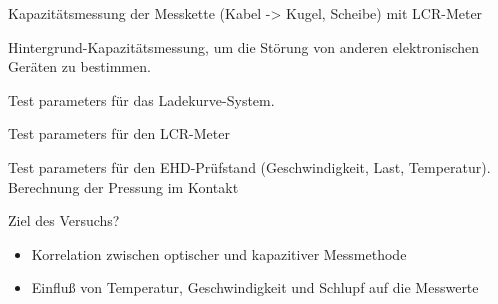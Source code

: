 Kapazitätsmessung der Messkette (Kabel -> Kugel, Scheibe) mit LCR-Meter

Hintergrund-Kapazitätsmessung, um die Störung von anderen elektronischen Geräten zu bestimmen.

Test parameters für das Ladekurve-System.

Test parameters für den LCR-Meter

Test parameters für den EHD-Prüfstand (Geschwindigkeit, Last, Temperatur).
Berechnung der Pressung im Kontakt

Ziel des Versuchs?
\begin{itemize}
    \item Korrelation zwischen optischer und kapazitiver Messmethode
    \item Einfluß von Temperatur, Geschwindigkeit und Schlupf auf die Messwerte
\end{itemize}

